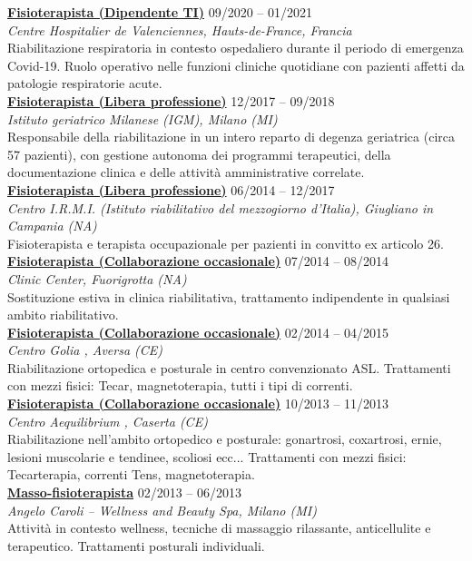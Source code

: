 \documentclass[a4paper]{article}
\newcommand{\voice}[5]{\href{#4}{\textbf{#1}} \hfill #2 \\ \textit{#3} \\ {\small #5} \vspace{0.2cm} \\}
\begin{document}
\begin{minipage}[t]{0.6\columnwidth}
    \voice{Fisioterapista (Dipendente TI)}
    {09/2020 -- 01/2021}
    {Centre Hospitalier de Valenciennes, Hauts-de-France, Francia}
    {https://www.ch-valenciennes.fr/}
    {
    Riabilitazione respiratoria in contesto ospedaliero durante il periodo di emergenza Covid-19. Ruolo operativo nelle funzioni cliniche quotidiane con pazienti affetti da patologie respiratorie acute.%
    }
    \voice{Fisioterapista (Libera professione)}
    {12/2017 -- 09/2018}
    {Istituto geriatrico Milanese (IGM), Milano (MI)}
    {https://www.igm-care.it/service/istituto-geriatrico-milanese/}
    {Responsabile della riabilitazione in un intero reparto di degenza geriatrica (circa 57 pazienti), con gestione autonoma dei programmi terapeutici, della documentazione clinica e delle attività amministrative correlate.}
    \voice{Fisioterapista (Libera professione)}
    {06/2014 -- 12/2017}
    {Centro I.R.M.I. (Istituto riabilitativo del mezzogiorno d'Italia), Giugliano in Campania (NA)}
    {https://www.aiopcampania.it/mostrascheda.asp?id=1425}
    {Fisioterapista e terapista occupazionale per pazienti in convitto ex articolo 26.}
    \voice{Fisioterapista (Collaborazione occasionale)}
    {07/2014 -- 08/2014}
    {Clinic Center, Fuorigrotta (NA)}
    {https://cliniccenter.eu/}
    {Sostituzione estiva in clinica riabilitativa, trattamento indipendente in qualsiasi ambito riabilitativo.
    }
    \voice{Fisioterapista (Collaborazione occasionale)}
    {02/2014 -- 04/2015}
    {Centro Golia , Aversa (CE)}
    {https://centrogolia.com/}
    {
        Riabilitazione ortopedica e posturale in centro convenzionato ASL.
        Trattamenti con mezzi fisici: Tecar, magnetoterapia, tutti i tipi di correnti.}
    \voice{Fisioterapista (Collaborazione occasionale)}
    {10/2013 -- 11/2013}
    {Centro Aequilibrium , Caserta (CE)}
    {https://www.fisioterapistacaserta.it/About}
    {Riabilitazione nell'ambito ortopedico e posturale:  gonartrosi, coxartrosi, ernie, lesioni muscolarie  e tendinee, scoliosi ecc...
    Trattamenti con mezzi fisici: Tecarterapia, correnti Tens, magnetoterapia.}
%
    \voice{Masso-fisioterapista}
    {02/2013 -- 06/2013}
    {Angelo Caroli – Wellness and Beauty Spa, Milano (MI)}
    {https://www.angelocaroli.com/}
    {
    Attività in contesto wellness, tecniche di massaggio rilassante, anticellulite e terapeutico.
    Trattamenti posturali individuali.
    }




















\end{minipage} 
\end{document}

